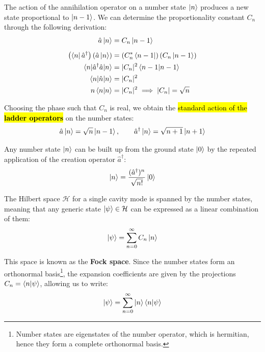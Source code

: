 The action of the annihilation operator on a number state $\ket{n}$ produces a new state proportional to $\ket{n-1}$. We can determine the proportionality constant $C_n$ through the following derivation:
\begin{align}
    \hat{a} \ket{n} &= C_n \ket{n-1} \label{eqn:11-annihilation-operator-number-state} \\[1ex]
    \left(\bra{n}\hat{a}^\dagger\right) \left(\hat{a}\ket{n}\right) &= \left(C_n^* \bra{n-1}\right) \left(C_n \ket{n-1}\right) \nonumber \\
    \braket{n|\hat{a}^\dagger\hat{a}|n} &= |C_n|^2 \braket{n-1|n-1} \nonumber \\
    \braket{n|\hat{n}|n} &= |C_n|^2 \nonumber \\
    n \braket{n|n} &= |C_n|^2 \implies |C_n| = \sqrt{n} \nonumber
\end{align}

Choosing the phase such that $C_n$ is real, we obtain the \hl{standard action of the \textbf{ladder operators}} on the number states:
\begin{equation}\label{eqn:11-ladder-operators-number-states}
\hat{a} \ket{n} = \sqrt{n} \ket{n-1}, \qquad \hat{a}^\dagger \ket{n} = \sqrt{n+1} \ket{n+1}
\end{equation}

Any number state $\ket{n}$ can be built up from the ground state $\ket{0}$ by the repeated application of the creation operator $\hat{a}^\dagger$:
\begin{equation}\label{eqn:11-number-state-recursive-construction}
\ket{n} = \frac{(\hat{a}^\dagger)^n}{\sqrt{n!}} \ket{0}
\end{equation}

The Hilbert space $\mathcal{H}$ for a single cavity mode is spanned by the number states, meaning that any generic state $\ket{\psi} \in \mathcal{H}$ can be expressed as a linear combination of them:
\begin{equation}\label{eqn:11-generic-state-number-states}
\ket{\psi} = \sum_{n=0}^{\infty} C_n \ket{n}
\end{equation}

This space is known as the \textbf{Fock space}. Since the number states form an orthonormal basis\footnote{Number states are eigenstates of the number operator, which is hermitian, hence they form a complete orthonormal basis.}, the expansion coefficients are given by the projections $C_n = \braket{n|\psi}$, allowing us to write:
\begin{equation}\label{eqn:11-generic-state-number-states-2}
\ket{\psi} = \sum_{n=0}^{\infty} \ket{n}\braket{n|\psi}
\end{equation}

